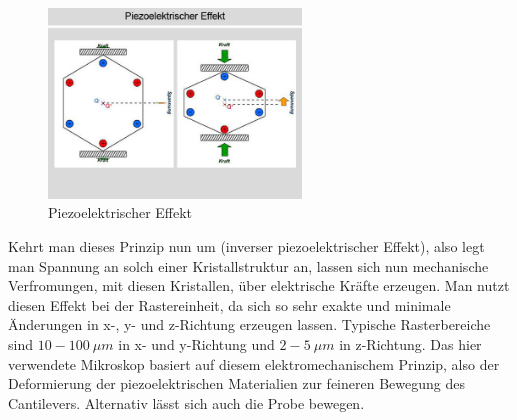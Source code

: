 \begin{figure}[h!]
    \centering
    \includegraphics[width=0.6\textwidth]{Abb/piezo.jpg}
    \caption{Piezoelektrischer Effekt}
    \label{piezo}
\end{figure}

Kehrt man dieses Prinzip nun um (inverser piezoelektrischer Effekt), also legt man Spannung an solch einer Kristallstruktur an, lassen sich nun mechanische Verfromungen, mit diesen Kristallen, über elektrische Kräfte erzeugen.
Man nutzt diesen Effekt bei der Rastereinheit, da sich so sehr exakte und minimale Änderungen in x-, y- und z-Richtung erzeugen lassen.
Typische Rasterbereiche sind $10-\SI{100}{\mu m}$ in x- und y-Richtung und $2-\SI{5}{\mu m}$ in z-Richtung.
Das hier verwendete Mikroskop basiert auf diesem elektromechanischem Prinzip, also der Deformierung der piezoelektrischen Materialien zur feineren Bewegung des Cantilevers.
Alternativ lässt sich auch die Probe bewegen.




